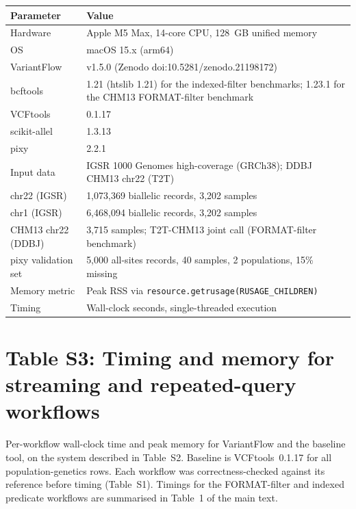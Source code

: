 \documentclass[11pt]{article}
\begin{document}
\begin{table}[ht]
\centering
\small
\begin{tabularx}{\linewidth}{lX}
\toprule
Parameter & Value \\
\midrule
Hardware & Apple M5 Max, 14-core CPU, 128~GB unified memory \\
OS & macOS 15.x (arm64) \\
VariantFlow & v1.5.0 (Zenodo doi:10.5281/zenodo.21198172) \\
bcftools & 1.21 (htslib 1.21) for the indexed-filter benchmarks; 1.23.1 for the CHM13 FORMAT-filter benchmark \\
VCFtools & 0.1.17 \\
scikit-allel & 1.3.13 \\
pixy & 2.2.1 \\
Input data & IGSR 1000 Genomes high-coverage (GRCh38); DDBJ CHM13 chr22 (T2T) \\
chr22 (IGSR) & 1,073,369 biallelic records, 3,202 samples \\
chr1 (IGSR) & 6,468,094 biallelic records, 3,202 samples \\
CHM13 chr22 (DDBJ) & 3,715 samples; T2T-CHM13 joint call (FORMAT-filter benchmark) \\
pixy validation set & 5,000 all-sites records, 40 samples, 2 populations, 15\% missing \\
Memory metric & Peak RSS via \texttt{resource.getrusage(RUSAGE\_CHILDREN)} \\
Timing & Wall-clock seconds, single-threaded execution \\
\bottomrule
\end{tabularx}
\end{table}

\newpage
\section*{Table S3: Timing and memory for streaming and repeated-query workflows}

Per-workflow wall-clock time and peak memory for VariantFlow and the baseline
tool, on the system described in Table~S2. Baseline is VCFtools~0.1.17 for all
population-genetics rows. Each workflow was correctness-checked against its
reference before timing (Table~S1). Timings for the FORMAT-filter and indexed
predicate workflows are summarised in Table~1 of the main text.
\end{document}
